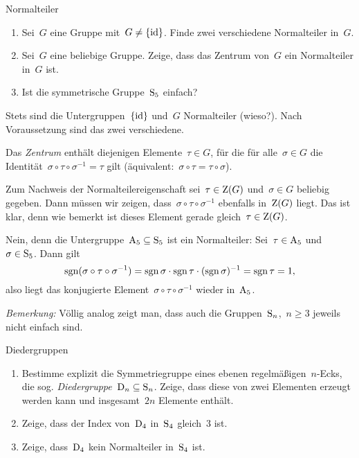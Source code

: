 \documentclass{algblatt}
\begin{document}
\begin{aufgabe}{Normalteiler}
\begin{enumerate}
\item Sei~$G$ eine Gruppe mit~$G \neq \{ \mathrm{id} \}$. Finde
zwei verschiedene Normalteiler in~$G$.
\item Sei~$G$ eine beliebige Gruppe. Zeige, dass das Zentrum von~$G$ ein
Normalteiler in~$G$ ist.
\item Ist die symmetrische Gruppe~$\mathrm{S}_5$ einfach?
\end{enumerate}

\begin{loesungE}
\item Stets sind die Untergruppen~$\{\mathrm{id}\}$ und~$G$ Normalteiler (wieso?). Nach
Voraussetzung sind das zwei verschiedene.

\item Das \emph{Zentrum} enthält diejenigen Elemente~$\tau \in G$, für die für
alle~$\sigma \in G$ die Identität~$\sigma \circ \tau \circ \sigma^{-1} = \tau$
gilt (äquivalent:~$\sigma \circ \tau = \tau \circ \sigma$).

Zum Nachweis der Normalteilereigenschaft sei~$\tau \in \mathrm{Z}(G)$ und~$\sigma \in
G$ beliebig gegeben. Dann müssen wir
zeigen, dass~$\sigma \circ \tau \circ \sigma^{-1}$ ebenfalls in~$\mathrm{Z}(G)$
liegt. Das ist klar, denn wie bemerkt ist dieses Element gerade gleich~$\tau
\in \mathrm{Z}(G)$.

\item Nein, denn die Untergruppe~$\mathrm{A}_5 \subseteq \mathrm{S}_5$ ist ein
Normalteiler: Sei~$\tau \in \mathrm{A}_5$ und~$\sigma \in \mathrm{S}_5$. Dann gilt
\[ \operatorname{sgn}(\sigma \circ \tau \circ \sigma^{-1}) =
  \operatorname{sgn}\sigma \cdot \operatorname{sgn}\tau \cdot (\operatorname{sgn}\sigma)^{-1} =
  \operatorname{sgn}\tau = 1, \]
also liegt das konjugierte Element~$\sigma \circ \tau \circ \sigma^{-1}$ wieder
in~$\mathrm{A}_5$.

\emph{Bemerkung:} Völlig analog zeigt man, dass auch die Gruppen~$\mathrm{S}_n$,~$n
\geq 3$ jeweils nicht einfach sind.
\end{loesungE}
\end{aufgabe}

\begin{aufgabe}{Diedergruppen}
\begin{enumerate}
\item Bestimme explizit die Symmetriegruppe eines ebenen regelmäßigen~$n$-Ecks,
die sog. \emph{Diedergruppe~$\mathrm{D}_n \subseteq \mathrm{S}_n$}. Zeige, dass
diese von zwei Elementen erzeugt werden kann und insgesamt~$2n$ Elemente
enthält.
\item Zeige, dass der Index von~$\mathrm{D}_4$ in~$\mathrm{S}_4$ gleich~$3$ ist.
\item Zeige, dass~$\mathrm{D}_4$ kein Normalteiler in~$\mathrm{S}_4$ ist.
\end{enumerate}
\end{aufgabe}
\end{document}

